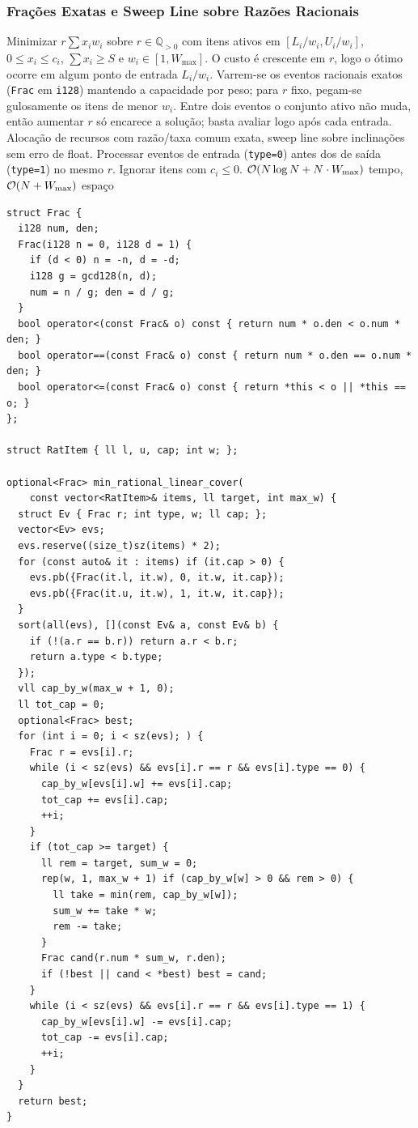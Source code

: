 \subsubsection{Frações Exatas e Sweep Line sobre Razões Racionais}
\algobox
  {Minimizar $r \sum x_i w_i$ sobre $r \in \mathbb{Q}_{>0}$ com itens ativos em $[L_i/w_i, U_i/w_i]$, $0 \le x_i \le c_i$, $\sum x_i \ge S$ e $w_i \in [1, W_{\max}]$.}
  {O custo é crescente em $r$, logo o ótimo ocorre em algum ponto de entrada $L_i/w_i$. Varrem-se os eventos racionais exatos (\texttt{Frac} em \texttt{i128}) mantendo a capacidade por peso; para $r$ fixo, pegam-se gulosamente os itens de menor $w_i$.}
  {Entre dois eventos o conjunto ativo não muda, então aumentar $r$ só encarece a solução; basta avaliar logo após cada entrada.}
  {Alocação de recursos com razão/taxa comum exata, sweep line sobre inclinações sem erro de float.}
  {Processar eventos de entrada (\texttt{type=0}) antes dos de saída (\texttt{type=1}) no mesmo $r$. Ignorar itens com $c_i \le 0$.}
  {$\mathcal{O}(N \log N + N \cdot W_{\max})$ tempo, $\mathcal{O}(N + W_{\max})$ espaço}

\begin{lstlisting}
struct Frac {
  i128 num, den;
  Frac(i128 n = 0, i128 d = 1) {
    if (d < 0) n = -n, d = -d;
    i128 g = gcd128(n, d);
    num = n / g; den = d / g;
  }
  bool operator<(const Frac& o) const { return num * o.den < o.num * den; }
  bool operator==(const Frac& o) const { return num * o.den == o.num * den; }
  bool operator<=(const Frac& o) const { return *this < o || *this == o; }
};

struct RatItem { ll l, u, cap; int w; };

optional<Frac> min_rational_linear_cover(
    const vector<RatItem>& items, ll target, int max_w) {
  struct Ev { Frac r; int type, w; ll cap; };
  vector<Ev> evs;
  evs.reserve((size_t)sz(items) * 2);
  for (const auto& it : items) if (it.cap > 0) {
    evs.pb({Frac(it.l, it.w), 0, it.w, it.cap});
    evs.pb({Frac(it.u, it.w), 1, it.w, it.cap});
  }
  sort(all(evs), [](const Ev& a, const Ev& b) {
    if (!(a.r == b.r)) return a.r < b.r;
    return a.type < b.type;
  });
  vll cap_by_w(max_w + 1, 0);
  ll tot_cap = 0;
  optional<Frac> best;
  for (int i = 0; i < sz(evs); ) {
    Frac r = evs[i].r;
    while (i < sz(evs) && evs[i].r == r && evs[i].type == 0) {
      cap_by_w[evs[i].w] += evs[i].cap;
      tot_cap += evs[i].cap;
      ++i;
    }
    if (tot_cap >= target) {
      ll rem = target, sum_w = 0;
      rep(w, 1, max_w + 1) if (cap_by_w[w] > 0 && rem > 0) {
        ll take = min(rem, cap_by_w[w]);
        sum_w += take * w;
        rem -= take;
      }
      Frac cand(r.num * sum_w, r.den);
      if (!best || cand < *best) best = cand;
    }
    while (i < sz(evs) && evs[i].r == r && evs[i].type == 1) {
      cap_by_w[evs[i].w] -= evs[i].cap;
      tot_cap -= evs[i].cap;
      ++i;
    }
  }
  return best;
}
\end{lstlisting}

